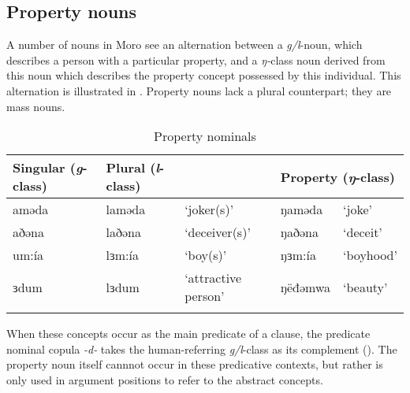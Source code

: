 \subsection{Property nouns}\label{sec:ch6:pcnominal}

A number of nouns in Moro see an alternation between a \textit{g/l}-noun, which describes a person with a particular property, and a \textit{ŋ-}class noun derived from this noun which describes the property concept possessed by this individual. This alternation is illustrated in . Property nouns lack a plural counterpart; they are mass nouns.

\begin{table}
\caption{Property nominals}\label{tab:ch6:property}
\begin{tabular}{lllll} %
\lsptoprule
 Singular (\textit{g}-class) &  Plural (\textit{l}-class) &  & \multicolumn{2}{l}{Property (\textit{ŋ}-class)}  \\
\midrule 
aməda	&  laməda	& `joker(s)' & ŋaməda & `joke'\\
aðəna	& 	laðəna	& `deceiver(s)'& ŋaðəna &  `deceit' \\
um:ía	& 	lɜm:ía	&  `boy(s)'	& ŋɜm:ía	& `boyhood' \\
ɜdum	& 	lɜdum	&  `attractive person'	& ŋëđǝmwa	& `beauty' \\ 
\lspbottomrule
\end{tabular}
\end{table}

When these concepts occur as the main predicate of a clause, the predicate nominal copula \textit{-d-} takes the human-referring \textit{g/l}-class as its complement (). The property noun itself cannnot occur in these predicative contexts, but rather is only used in argument positions to refer to the abstract concepts. %





%

